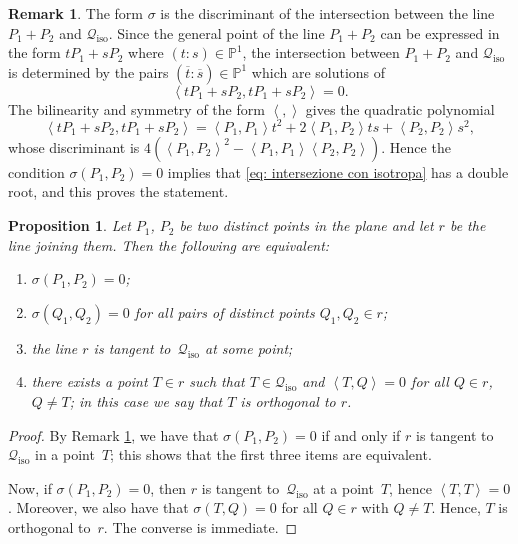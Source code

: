 \documentclass{amsart}
\theoremstyle{plain}
\newtheorem{prop}[lemma]{Proposition}
\theoremstyle{definition}
\newtheorem{rmk}[lemma]{Remark}
\newcommand{\p}{\mathbb{P}}
\newcommand{\iso}{\mathcal{Q}_{\mathrm{iso}}}
\newcommand{\scl}[2]{\left\langle {#1}, {#2} \right\rangle}
\begin{document}
\begin{rmk}\label{rmk: sigma discr}
The form $\sigma$ is the discriminant of the intersection between the line $P_1+P_2$ and $\iso$.
Since the general point of the line $P_1 + P_2$ can be expressed in the form
$t P_1 + sP_2$ where $(t:s) \in \p^1$, the intersection between $P_1+P_2$
and $\iso$ is determined by the pairs $( \overline t: \overline s)\in \p^1$ which are solutions of
$$
\scl{t P_1 + sP_2}{t P_1 + sP_2} =0.
$$
The bilinearity and symmetry of the form $\scl{}{}$ gives the quadratic polynomial
\begin{equation}\label{eq: intersezione con isotropa}
\scl{t P_1 + sP_2}{t P_1 + sP_2}= \scl{P_1}{P_1} t^2
+2\scl{P_1}{P_2} ts + \scl{P_2}{P_2}s^2,
\end{equation}
whose discriminant is $4 ( \scl{P_1}{P_2}^2 - \scl{P_1}{P_1} \scl{P_2}{P_2})$.
Hence the condition $\sigma(P_1,P_2)=0$ implies that \eqref{eq: intersezione con isotropa}
has a double root, and this proves the statement.
\end{rmk}

\begin{prop}
\label{proposition:sigma_tangency}
  Let $P_1$, $P_2$ be two distinct points in the plane and let $r$ be the line joining them.
  Then the following are equivalent:
  \begin{enumerate}
  \item $\sigma(P_1, P_2) = 0$;
  \item $\sigma(Q_1, Q_2) = 0$ for all pairs of distinct points $Q_1, Q_2 \in r$;
  \item the line $r$ is tangent to~$\iso$ at some point;
  \item there exists a point $T \in r$ such that  $T \in \iso$ and $\scl{T}{Q} = 0$ for all $Q \in r$, $Q \neq T$; in this case we say that $T$ is \emph{orthogonal} to $r$.
  \end{enumerate}
\end{prop}
\begin{proof}
  By Remark \ref{rmk: sigma discr}, we have that $\sigma(P_1, P_2) = 0$ if and only if $r$ is tangent to~$\iso$ in a point~$T$; this shows that the first three items are equivalent.

  Now, if $\sigma(P_1, P_2) = 0$, then $r$ is tangent to~$\iso$ at a point~$T$, hence $\scl{T}{T} = 0$. Moreover, we also have that $\sigma(T, Q) = 0$ for all $Q \in r$ with $Q \neq T$. Hence, $T$ is orthogonal to~$r$.
  The converse is immediate.
\end{proof}
\end{document}
